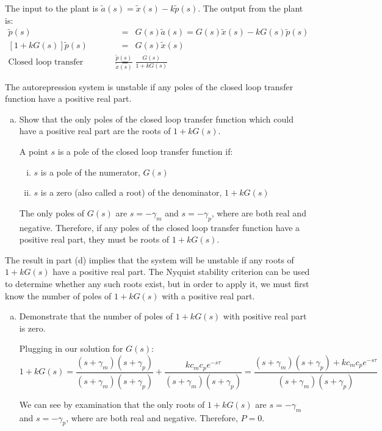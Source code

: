 \documentclass{article}
\begin{document}
\begin{enumerate}[a)]
{\color{red}

The input to the plant is $\tilde{a}(s) = \tilde{x}(s) - k \tilde{p}(s)$. The output from the plant is:
\begin{eqnarray*}
\tilde{p}(s) & = & G(s) \tilde{a}(s) = G(s)  \tilde{x}(s) - k G(s) \tilde{p}(s)\\
\left[ 1 + k G(s) \right] \tilde{p}(s) & = & G(s)  \tilde{x}(s)\\
\textrm{Closed loop transfer function } \frac{\tilde{p}(s)}{\tilde{x}(s)} & = & \frac{G(s)}{1+kG(s)}
\end{eqnarray*}
}

\end{enumerate}
The autorepression system is unstable if any poles of the closed loop transfer function have a positive real part.
\begin{enumerate}[a)]
\setlength{\itemsep}{0pt}
\setcounter{enumi}{3}
\item Show that the only poles of the closed loop transfer function which could have a positive real part are the roots of $1 + kG(s)$.\\

{\color{red}

A point $s$ is a pole of the closed loop transfer function if:
\begin{enumerate}[i)]
\item $s$ is a pole of the numerator, $G(s)$
\item $s$ is a zero (also called a root) of the denominator, $1+kG(s)$
\end{enumerate}

The only poles of $G(s)$ are $s=-\gamma_m$ and $s=-\gamma_p$, where are both real and negative. Therefore, if any poles of the closed loop transfer function have a positive real part, they must be roots of $1+kG(s)$.
}

\end{enumerate}
The result in part (d) implies that the system will be unstable if any roots of $1 + kG(s)$ have a positive real part. The Nyquist stability criterion can be used to determine whether any such roots exist, but in order to apply it, we must first know the number of poles of $1 + kG(s)$ with a positive real part.
\begin{enumerate}[a)]
\setlength{\itemsep}{0pt}
\setcounter{enumi}{4}
\item Demonstrate that the number of poles of $1 + kG(s)$ with positive real part is zero.\\

{\color{red}
Plugging in our solution for $G(s)$:
\[ 1 + k G(s) = \frac{(s + \gamma_m)(s+\gamma_p)}{(s + \gamma_m)(s+\gamma_p)} + \frac{kc_m c_pe^{-s\tau}}{(s + \gamma_m)(s+\gamma_p)}  = \frac{(s + \gamma_m)(s+\gamma_p) + k c_m c_pe^{-s\tau}}{(s + \gamma_m)(s+\gamma_p)} \]

We can see by examination that the only roots of $1+kG(s)$ are $s=-\gamma_m$ and $s=-\gamma_p$, where are both real and negative. Therefore, $P=0$.

}
\end{enumerate}
\end{document}
